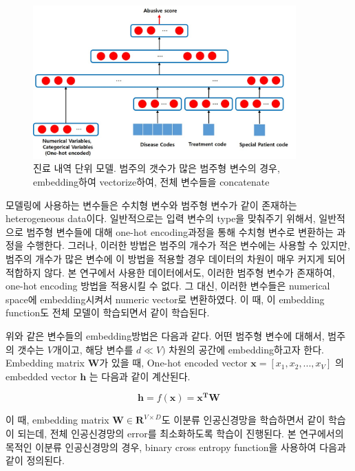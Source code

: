 \documentclass[11pt]{article}           %
\begin{document}
\begin{figure}[h]
   \centering
   \vspace{0.5cm}
   \includegraphics[width=0.9\textwidth]{[figure2]network_structure.jpg}
   \vspace{-0.5cm}
   \caption{진료 내역 단위 모델. 범주의 갯수가 많은 범주형 변수의 경우, embedding하여 vectorize하여, 전체 변수들을 concatenate}
   \vspace{0.5cm}
   \label{fig:model structure}
\end{figure}

모델링에 사용하는 변수들은 수치형 변수와 범주형 변수가 같이 존재하는 heterogeneous data이다.
일반적으로는 입력 변수의 type을 맞춰주기 위해서, 일반적으로 범주형 변수들에 대해 one-hot encoding과정을 통해 수치형 변수로 변환하는 과정을 수행한다.
그러나, 이러한 방법은 범주의 개수가 적은 변수에는 사용할 수 있지만, 범주의 개수가 많은 변수에 이 방법을 적용할 경우 데이터의 차원이 매우 커지게 되어 적합하지 않다.
본 연구에서 사용한 데이터에서도, 이러한 범주형 변수가 존재하여, one-hot encoding 방법을 적용시킬 수 없다.
그 대신, 이러한 변수들은 numerical space에 embedding시켜서 numeric vector로 변환하였다.
이 때, 이 embedding function도 전체 모델이 학습되면서 같이 학습된다.

위와 같은 변수들의 embedding방법은 다음과 같다. 어떤 범주형 변수에 대해서, 범주의 갯수는 $V$개이고, 해당 변수를 $d \ll V)$ 차원의 공간에 embedding하고자 한다.
Embedding matrix $\mathbf{W}$가 있을 때, One-hot encoded vector $\mathbf{x} = [x_1, x_2, ..., x_V]$ 의 embedded vector $\mathbf{h}$ 는 다음과 같이 계산된다.

$$\mathbf{h} = f(\mathbf{x}) = \mathbf{x^T}\mathbf{W}$$

이 때, embedding matrix $\mathbf{W} \in\mathbf{R}^{V \times D}$도 이분류 인공신경망을 학습하면서 같이 학습이 되는데, 전체 인공신경망의 error를 최소화하도록 학습이 진행된다.
본 연구에서의 목적인 이분류 인공신경망의 경우, binary cross entropy function을 사용하여 다음과 같이 정의된다.
\end{document}
